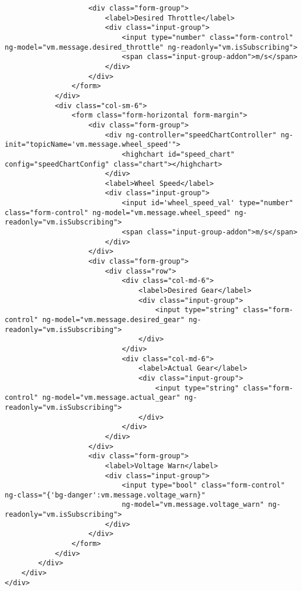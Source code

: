 \begin{verbatim}
                    <div class="form-group">
                        <label>Desired Throttle</label>
                        <div class="input-group">
                            <input type="number" class="form-control" ng-model="vm.message.desired_throttle" ng-readonly="vm.isSubscribing">
                            <span class="input-group-addon">m/s</span>
                        </div>
                    </div>
                </form>
            </div>
            <div class="col-sm-6">
                <form class="form-horizontal form-margin">
                    <div class="form-group">
                        <div ng-controller="speedChartController" ng-init="topicName='vm.message.wheel_speed'">
                            <highchart id="speed_chart" config="speedChartConfig" class="chart"></highchart>
                        </div>
                        <label>Wheel Speed</label>
                        <div class="input-group">
                            <input id='wheel_speed_val' type="number" class="form-control" ng-model="vm.message.wheel_speed" ng-readonly="vm.isSubscribing">
                            <span class="input-group-addon">m/s</span>
                        </div>
                    </div>
                    <div class="form-group">
                        <div class="row">
                            <div class="col-md-6">
                                <label>Desired Gear</label>
                                <div class="input-group">
                                    <input type="string" class="form-control" ng-model="vm.message.desired_gear" ng-readonly="vm.isSubscribing">
                                </div>
                            </div>
                            <div class="col-md-6">
                                <label>Actual Gear</label>
                                <div class="input-group">
                                    <input type="string" class="form-control" ng-model="vm.message.actual_gear" ng-readonly="vm.isSubscribing">
                                </div>
                            </div>
                        </div>
                    </div>
                    <div class="form-group">
                        <label>Voltage Warn</label>
                        <div class="input-group">
                            <input type="bool" class="form-control" ng-class="{'bg-danger':vm.message.voltage_warn}" 
                            ng-model="vm.message.voltage_warn" ng-readonly="vm.isSubscribing">
                        </div>
                    </div>
                </form>
            </div>
        </div>
    </div>
</div>
\end{verbatim}
\endgroup






